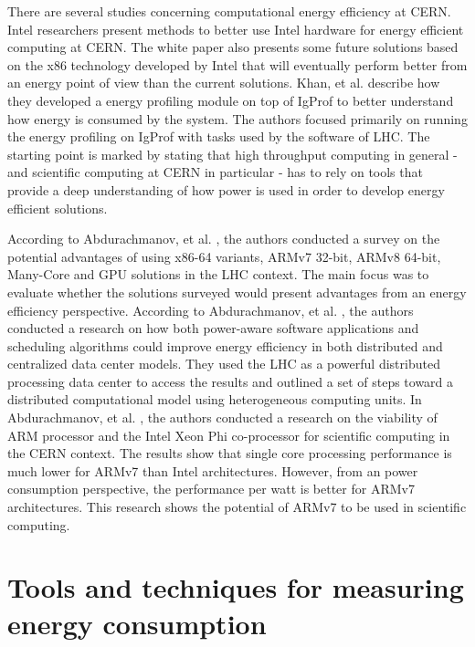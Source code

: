 There are several studies concerning computational energy efficiency at CERN. Intel researchers \cite{INTEL_WP} present methods to better use Intel hardware for energy efficient computing at CERN. The white paper also presents some future solutions based on the x86 technology developed by Intel that will eventually perform better from an energy point of view than the current solutions. Khan, et al. \cite{IGPROF} describe how they developed a energy profiling module on top of IgProf to better understand how energy is consumed by the system. The authors focused primarily on running the energy profiling on IgProf with tasks used by the software of LHC. The starting point is marked by stating that high throughput computing in general - and scientific computing at CERN in particular - has to rely on tools that provide a deep understanding of how power is used in order to develop energy efficient solutions.

According to Abdurachmanov, et al. \cite{FUTURE_CERN}, the authors conducted a survey on the potential advantages of using x86-64 variants, ARMv7 32-bit, ARMv8 64-bit, Many-Core and GPU solutions in the LHC context. The main focus was to evaluate whether the solutions surveyed would present advantages from an energy efficiency perspective. According to Abdurachmanov, et al. \cite{POWER_AWAR_CERN}, the authors conducted a research on how both power-aware software applications and scheduling algorithms could improve energy efficiency in both distributed and centralized data center models. They used the LHC as a powerful distributed processing data center to access the results and outlined a set of steps toward a distributed computational model using heterogeneous computing units. In Abdurachmanov, et al. \cite{EXPLORATIONS_CERN}, the authors conducted a research on the viability of ARM processor and the Intel Xeon Phi co-processor for scientific computing in the CERN context. The results show that single core processing performance is much lower for ARMv7 than Intel architectures. However, from an power consumption perspective, the performance per watt is better for ARMv7 architectures. This research shows the potential of ARMv7 to be used in scientific computing.

\section{Tools and techniques for measuring energy consumption} %

